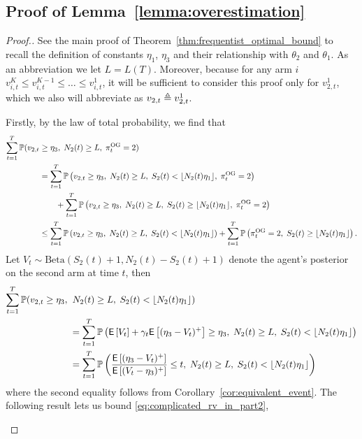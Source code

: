 \subsection{Proof of Lemma~\ref{lemma:overestimation}} \label{proof:overestimation_proof}

\begin{proof}[Proof.]
	See the main proof of Theorem~\ref{thm:frequentist_optimal_bound} to recall the definition of constants $\eta_1$, $\eta_3$ and their relationship with $\theta_2$ and $\theta_1$. As an abbreviation we let $L = L(T)$. Moreover, because for any arm $i$ $v^K_{i,t} \le v^{K-1}_{i,t} \le \ldots \le v^1_{i,t}$, it will be sufficient to consider this proof only for $v^1_{2,t}$, which we also will abbreviate as $v_{2,t} \triangleq v^1_{2,t}$.
	
	Firstly, by the law of total probability, we find that
	\begin{align} 
	\sum_{t=1}^T \mathbb{P}(v_{2,t} & \ge \eta_3 ,\; N_2(t) \ge L,\; \pi^{\rm OG}_t = 2) \nonumber \\
	& = \sum_{t=1}^T \mathbb{P} \left( v_{2,t} \ge \eta_3 ,\; N_2(t) \ge L, \; S_2(t) < \lfloor N_2(t) \eta_1\rfloor, \; \pi^{\rm OG}_t = 2 \right) \nonumber \\
	& \qquad + \sum_{t=1}^T \mathbb{P} \left( v_{2,t} \ge \eta_3 ,\; N_2(t) \ge L, \; S_2(t) \ge \lfloor N_2(t) \eta_1\rfloor,\; \pi^{\rm OG}_t = 2 \right) \nonumber \\
	& \le \sum_{t=1}^T \mathbb{P} \left( v_{2,t} \ge \eta_3 ,\; N_2(t) \ge L, \; S_2(t) < \lfloor N_2(t) \eta_1\rfloor \right) + \sum_{t=1}^T \mathbb{P} \left( \pi^{\rm OG}_t = 2,\; S_2(t) \ge \lfloor N_2(t) \eta_1\rfloor \right) \label{eqn:splitting_not_underestimate}.
	\end{align}
	Let $V_t \sim \text{Beta}(S_2(t) + 1, N_2(t)- S_2(t) + 1)$ denote the agent's posterior on the second arm at time $t$, then
	\begin{align}
	\sum_{t=1}^T \mathbb{P}(v_{2,t} \ge \eta_3 ,\; & \; N_2(t) \ge L,\; S_2(t) < \lfloor N_2(t) \eta_1\rfloor)  \nonumber\\
	& = \sum_{t=1}^T \mathbb{P} \left( \mathsf{E} \left[ V_t \right] + \gamma_t \mathsf{E} \left[ (\eta_3 - V_t)^+ \right] \ge \eta_3, \; N_2(t) \ge L,\; S_2(t) < \lfloor N_2(t) \eta_1\rfloor \right) \nonumber \\
	& = \sum_{t=1}^T \mathbb{P} \left( \frac{\mathsf{E} \left[ (\eta_3-V_t)^+  \right]}{  \mathsf{E} \left[ (V_t - \eta_3)^+  \right]} \le t , \; N_2(t) \ge L,\; S_2(t) < \lfloor N_2(t) \eta_1\rfloor \right) \label{eq:complicated_rv_in_part2}
	\end{align}
	where the second equality follows from Corollary~\ref{cor:equivalent_event}. The following result lets us bound \eqref{eq:complicated_rv_in_part2},
	\begin{lemma} \label{lem:lb_rv2}

\end{lemma}
\end{proof}
